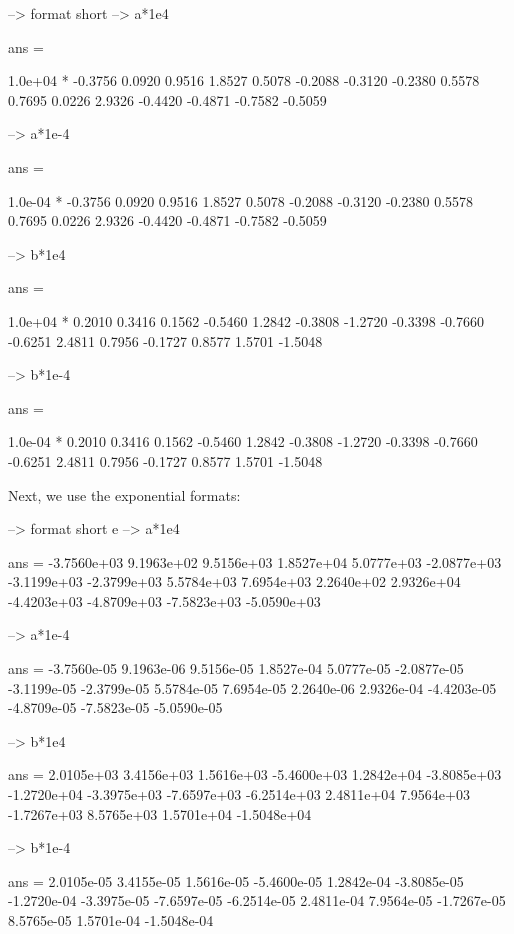 \begin{DoxyVerbInclude}
--> format short
--> a*1e4

ans = 

   1.0e+04 * 
   -0.3756    0.0920    0.9516    1.8527 
    0.5078   -0.2088   -0.3120   -0.2380 
    0.5578    0.7695    0.0226    2.9326 
   -0.4420   -0.4871   -0.7582   -0.5059 

--> a*1e-4

ans = 

   1.0e-04 * 
   -0.3756    0.0920    0.9516    1.8527 
    0.5078   -0.2088   -0.3120   -0.2380 
    0.5578    0.7695    0.0226    2.9326 
   -0.4420   -0.4871   -0.7582   -0.5059 

--> b*1e4

ans = 

   1.0e+04 * 
    0.2010    0.3416    0.1562   -0.5460 
    1.2842   -0.3808   -1.2720   -0.3398 
   -0.7660   -0.6251    2.4811    0.7956 
   -0.1727    0.8577    1.5701   -1.5048 

--> b*1e-4

ans = 

   1.0e-04 * 
    0.2010    0.3416    0.1562   -0.5460 
    1.2842   -0.3808   -1.2720   -0.3398 
   -0.7660   -0.6251    2.4811    0.7956 
   -0.1727    0.8577    1.5701   -1.5048 
\end{DoxyVerbInclude}


Next, we use the exponential formats\-:


\begin{DoxyVerbInclude}
--> format short e
--> a*1e4

ans = 
 -3.7560e+03  9.1963e+02  9.5156e+03  1.8527e+04 
  5.0777e+03 -2.0877e+03 -3.1199e+03 -2.3799e+03 
  5.5784e+03  7.6954e+03  2.2640e+02  2.9326e+04 
 -4.4203e+03 -4.8709e+03 -7.5823e+03 -5.0590e+03 

--> a*1e-4

ans = 
 -3.7560e-05  9.1963e-06  9.5156e-05  1.8527e-04 
  5.0777e-05 -2.0877e-05 -3.1199e-05 -2.3799e-05 
  5.5784e-05  7.6954e-05  2.2640e-06  2.9326e-04 
 -4.4203e-05 -4.8709e-05 -7.5823e-05 -5.0590e-05 

--> b*1e4

ans = 
  2.0105e+03  3.4156e+03  1.5616e+03 -5.4600e+03 
  1.2842e+04 -3.8085e+03 -1.2720e+04 -3.3975e+03 
 -7.6597e+03 -6.2514e+03  2.4811e+04  7.9564e+03 
 -1.7267e+03  8.5765e+03  1.5701e+04 -1.5048e+04 

--> b*1e-4

ans = 
  2.0105e-05  3.4155e-05  1.5616e-05 -5.4600e-05 
  1.2842e-04 -3.8085e-05 -1.2720e-04 -3.3975e-05 
 -7.6597e-05 -6.2514e-05  2.4811e-04  7.9564e-05 
 -1.7267e-05  8.5765e-05  1.5701e-04 -1.5048e-04 
\end{DoxyVerbInclude}



